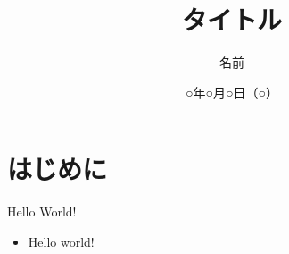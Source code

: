 \documentclass{jsarticle}
\title{タイトル}
\author{名前} %
\date{○年○月○日（○）} %
\begin{document}
\maketitle

\tableofcontents

\section{はじめに}
Hello World!
\begin{itemize}
  \item Hello world!
\end{itemize}
\end{document}

